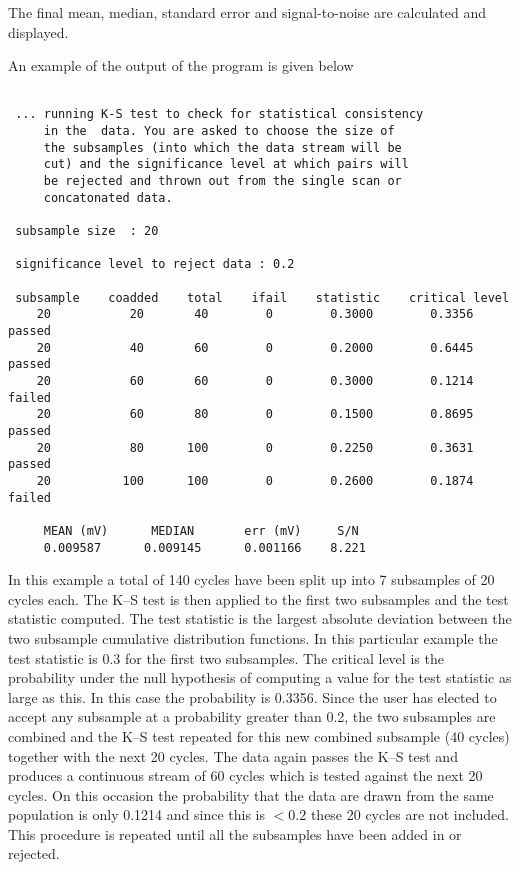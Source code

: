The final mean, median, standard error and signal-to-noise are calculated and
displayed.

An example of the output of the program is given below

\begin{verbatim}

 ... running K-S test to check for statistical consistency
     in the  data. You are asked to choose the size of
     the subsamples (into which the data stream will be
     cut) and the significance level at which pairs will
     be rejected and thrown out from the single scan or
     concatonated data.

 subsample size  : 20

 significance level to reject data : 0.2

 subsample    coadded    total    ifail    statistic    critical level
    20           20       40        0        0.3000        0.3356      passed
    20           40       60        0        0.2000        0.6445      passed
    20           60       60        0        0.3000        0.1214      failed
    20           60       80        0        0.1500        0.8695      passed
    20           80      100        0        0.2250        0.3631      passed
    20          100      100        0        0.2600        0.1874      failed

     MEAN (mV)      MEDIAN       err (mV)     S/N
     0.009587      0.009145      0.001166    8.221

\end{verbatim}

In this example a total of 140 cycles have been split up into 7 subsamples of
20 cycles each. The K--S test is then applied to the first two subsamples
and the test statistic computed. The test statistic is the largest absolute
deviation between the two subsample cumulative distribution functions. In this
particular example the test statistic is 0.3 for the first two subsamples.
The critical level is the probability under the null hypothesis of computing a
value for the test statistic as large as this. In this case the probability
is 0.3356. Since the user has elected to accept any subsample at a probability
greater than 0.2, the two subsamples are combined and the K--S test repeated
for this new combined subsample (40 cycles) together with the next 20 cycles.
The data again passes the K--S test and produces a continuous stream of 60
cycles which is tested against the next 20 cycles. On this occasion the
probability that the data are drawn from the same population is only 0.1214
and since this is $< 0.2$ these 20 cycles are not included.
This procedure is repeated until all the subsamples have been added
in or rejected.

